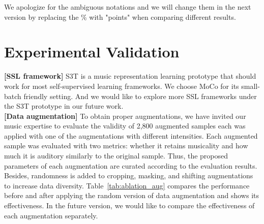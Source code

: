 \documentclass{article}
\begin{document}
We apologize for the ambiguous notations and we will change them in the next version by replacing the \% with "points" when comparing different results.

\section{Experimental Validation}
\textbf{[SSL framework]} S3T is a music representation learning prototype that should work for most self-supervised learning frameworks. We choose MoCo for its small-batch friendly setting. And we would like to explore more SSL frameworks under the S3T prototype in our future work. \\

\noindent\textbf{[Data augmentation]} 
To obtain proper augmentations, we have invited our music expertise to evaluate the validity of 2,800 augmented samples each was applied with one of the augmentations with different intensities.
Each augmented sample was evaluated with two metrics: whether it retains musicality and how much it is auditory similarly to the original sample. Thus, the proposed parameters of each augmentation are curated according to the evaluation results. Besides, randomness is added to cropping, masking, and shifting augmentations to increase data diversity.
Table~\ref{tab:ablation_aug} compares the performance before and after applying the random version of data augmentation and shows its effectiveness. In the future version, we would like to compare the effectiveness of each augmentation separately.
\end{document}
